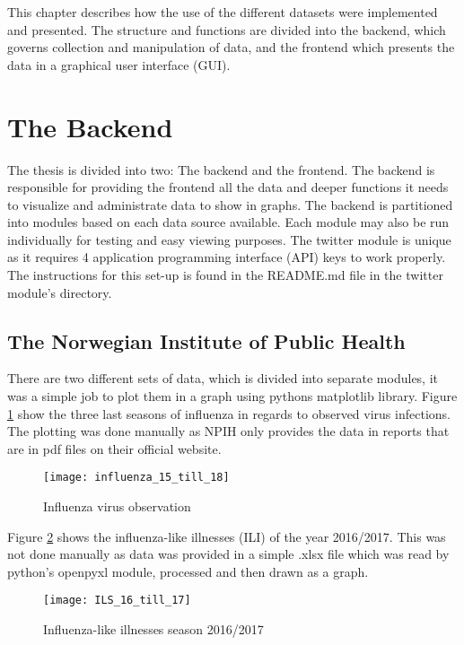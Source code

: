 This chapter describes how the use of the different datasets were implemented and presented. The structure and functions are divided into the backend, which governs collection and manipulation of data, and the frontend which presents the data in a graphical user interface (GUI).

\section{The Backend}
The thesis is divided into two: The backend and the frontend. The backend is responsible for providing the frontend all the data and deeper functions it needs to visualize and administrate data to show in graphs. The backend is partitioned into modules based on each data source available. Each module may also be run individually for testing and easy viewing purposes. The twitter module is unique as it requires 4 application programming interface (API) keys to work properly. The instructions for this set-up is found in the README.md file in the twitter module's directory.







\subsection{The Norwegian Institute of Public Health}
There are two different sets of data, which is divided into separate modules, it was a simple job to plot them in a graph using pythons matplotlib library. Figure \ref{fig:infstat} show the three last seasons of influenza in regards to observed virus infections. The plotting was done manually as NPIH only provides the data in reports that are in pdf files on their official website\cite{fhi}.

\begin{figure}[h]
\texttt{[image: influenza\_15\_till\_18]}
\centering
\caption{Influenza virus observation}
\label{fig:infstat}
\end{figure}

Figure \ref{fig:ilsstat} shows the influenza-like illnesses (ILI) of the year 2016/2017. This was not done manually as data was provided in a simple .xlsx file which was read by python's openpyxl module, processed and then drawn as a graph.

\begin{figure}[ht]
\texttt{[image: ILS\_16\_till\_17]}
\centering
\caption{Influenza-like illnesses season 2016/2017}
\label{fig:ilsstat}
\end{figure}

